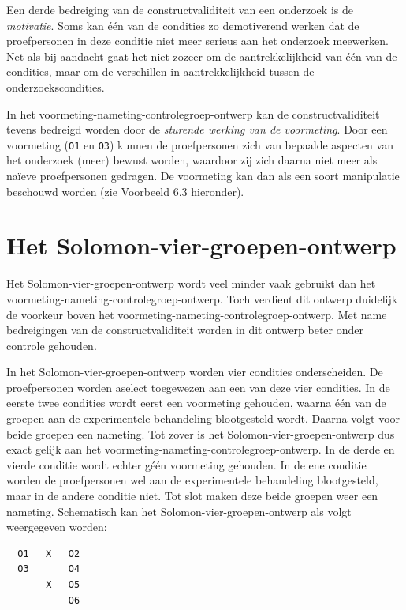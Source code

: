 \documentclass[
]{book}
\begin{document}
Een derde bedreiging van de constructvaliditeit van een onderzoek is de
\emph{motivatie}. Soms kan één van de condities zo demotiverend werken dat de
proefpersonen in deze conditie niet meer serieus aan het onderzoek
meewerken. Net als bij aandacht gaat het niet zozeer om de
aantrekkelijkheid van één van de condities, maar om de verschillen in
aantrekkelijkheid tussen de onderzoekscondities.

In het voormeting-nameting-controlegroep-ontwerp kan de
constructvaliditeit tevens bedreigd worden door de \emph{sturende werking van
de voormeting}. Door een voormeting (\texttt{O1} en \texttt{O3}) kunnen de
proefpersonen zich van bepaalde aspecten van het onderzoek (meer) bewust
worden, waardoor zij zich daarna niet meer als naïeve proefpersonen
gedragen. De voormeting kan dan als een soort manipulatie beschouwd
worden (zie Voorbeeld 6.3 hieronder).

\hypertarget{sec:solomon-vier-groepen-ontwerp}{%
\section{Het Solomon-vier-groepen-ontwerp}\label{sec:solomon-vier-groepen-ontwerp}}

Het Solomon-vier-groepen-ontwerp wordt veel minder vaak gebruikt dan het
voormeting-nameting-controlegroep-ontwerp. Toch verdient dit ontwerp
duidelijk de voorkeur boven het
voormeting-nameting-controlegroep-ontwerp. Met name bedreigingen van de
constructvaliditeit worden in dit ontwerp beter onder controle gehouden.

In het Solomon-vier-groepen-ontwerp worden vier condities onderscheiden.
De proefpersonen worden aselect toegewezen aan een van deze vier
condities. In de eerste twee condities wordt eerst een voormeting
gehouden, waarna één van de groepen aan de experimentele behandeling
blootgesteld wordt. Daarna volgt voor beide groepen een nameting. Tot
zover is het Solomon-vier-groepen-ontwerp dus exact gelijk aan het
voormeting-nameting-controlegroep-ontwerp. In de derde en vierde
conditie wordt echter géén voormeting gehouden. In de ene conditie
worden de proefpersonen wel aan de experimentele behandeling
blootgesteld, maar in de andere conditie niet. Tot slot maken deze beide
groepen weer een nameting. Schematisch kan het
Solomon-vier-groepen-ontwerp als volgt weergegeven worden:

\begin{verbatim}
  O1   X   O2
  O3       O4
       X   O5
           O6
\end{verbatim}
\end{document}
